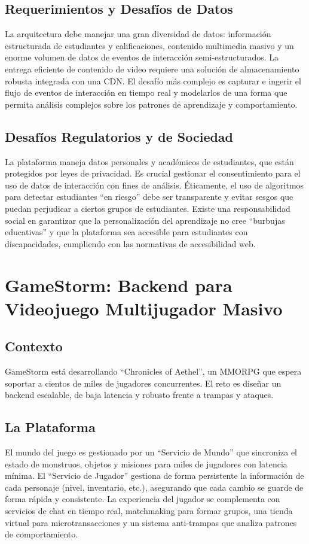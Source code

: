 \documentclass[12pt]{article}
\begin{document}
\subsection{Requerimientos y Desafíos de Datos}
La arquitectura debe manejar una gran diversidad de datos: información estructurada de estudiantes y calificaciones, contenido multimedia masivo y un enorme volumen de datos de eventos de interacción semi-estructurados. La entrega eficiente de contenido de video requiere una solución de almacenamiento robusta integrada con una CDN. El desafío más complejo es capturar e ingerir el flujo de eventos de interacción en tiempo real y modelarlos de una forma que permita análisis complejos sobre los patrones de aprendizaje y comportamiento.

\subsection{Desafíos Regulatorios y de Sociedad}
La plataforma maneja datos personales y académicos de estudiantes, que están protegidos por leyes de privacidad. Es crucial gestionar el consentimiento para el uso de datos de interacción con fines de análisis. Éticamente, el uso de algoritmos para detectar estudiantes ``en riesgo'' debe ser transparente y evitar sesgos que puedan perjudicar a ciertos grupos de estudiantes. Existe una responsabilidad social en garantizar que la personalización del aprendizaje no cree ``burbujas educativas'' y que la plataforma sea accesible para estudiantes con discapacidades, cumpliendo con las normativas de accesibilidad web.

\newpage

\section{GameStorm: Backend para Videojuego Multijugador Masivo}

\subsection{Contexto}
GameStorm está desarrollando ``Chronicles of Aethel'', un MMORPG que espera soportar a cientos de miles de jugadores concurrentes. El reto es diseñar un backend escalable, de baja latencia y robusto frente a trampas y ataques.

\subsection{La Plataforma}
El mundo del juego es gestionado por un ``Servicio de Mundo'' que sincroniza el estado de monstruos, objetos y misiones para miles de jugadores con latencia mínima. El ``Servicio de Jugador'' gestiona de forma persistente la información de cada personaje (nivel, inventario, etc.), asegurando que cada cambio se guarde de forma rápida y consistente. La experiencia del jugador se complementa con servicios de chat en tiempo real, matchmaking para formar grupos, una tienda virtual para microtransacciones y un sistema anti-trampas que analiza patrones de comportamiento.
\end{document}
